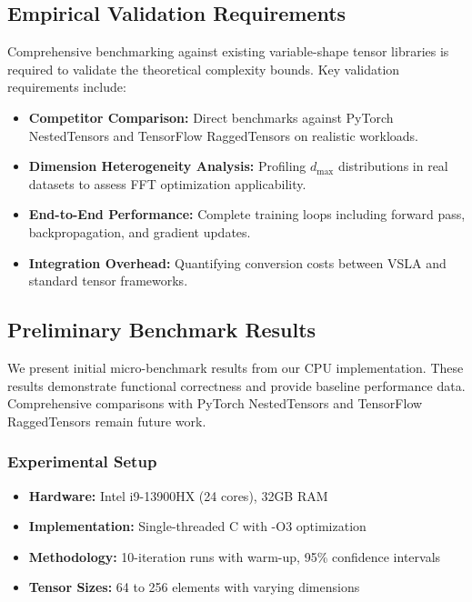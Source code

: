 \subsection{Empirical Validation Requirements}

Comprehensive benchmarking against existing variable-shape tensor libraries is required to validate the theoretical complexity bounds. Key validation requirements include:

\begin{itemize}[leftmargin=1.5em]
\item \textbf{Competitor Comparison:} Direct benchmarks against PyTorch NestedTensors and TensorFlow RaggedTensors on realistic workloads.
\item \textbf{Dimension Heterogeneity Analysis:} Profiling $d_{\max}$ distributions in real datasets to assess FFT optimization applicability.
\item \textbf{End-to-End Performance:} Complete training loops including forward pass, backpropagation, and gradient updates.
\item \textbf{Integration Overhead:} Quantifying conversion costs between VSLA and standard tensor frameworks.
\end{itemize}

\subsection{Preliminary Benchmark Results}

We present initial micro-benchmark results from our CPU implementation. These results demonstrate functional correctness and provide baseline performance data. Comprehensive comparisons with PyTorch NestedTensors and TensorFlow RaggedTensors remain future work.

\subsubsection{Experimental Setup}
\begin{itemize}[leftmargin=1.5em]
\item \textbf{Hardware:} Intel i9-13900HX (24 cores), 32GB RAM
\item \textbf{Implementation:} Single-threaded C with -O3 optimization
\item \textbf{Methodology:} 10-iteration runs with warm-up, 95\% confidence intervals
\item \textbf{Tensor Sizes:} 64 to 256 elements with varying dimensions
\end{itemize}

